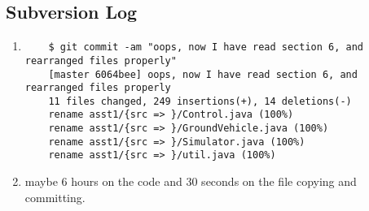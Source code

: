 \documentclass{article}
\begin{document}
\subsection{Subversion Log}
\begin{enumerate}
	\item
	\begin{verbatim}
	$ git commit -am "oops, now I have read section 6, and rearranged files properly"
	[master 6064bee] oops, now I have read section 6, and rearranged files properly
	11 files changed, 249 insertions(+), 14 deletions(-)
	rename asst1/{src => }/Control.java (100%)
	rename asst1/{src => }/GroundVehicle.java (100%)
	rename asst1/{src => }/Simulator.java (100%)
	rename asst1/{src => }/util.java (100%)
	\end{verbatim}
	\item maybe 6 hours on the code and 30 seconds on the file copying and committing.
\end{enumerate}
\end{document}
